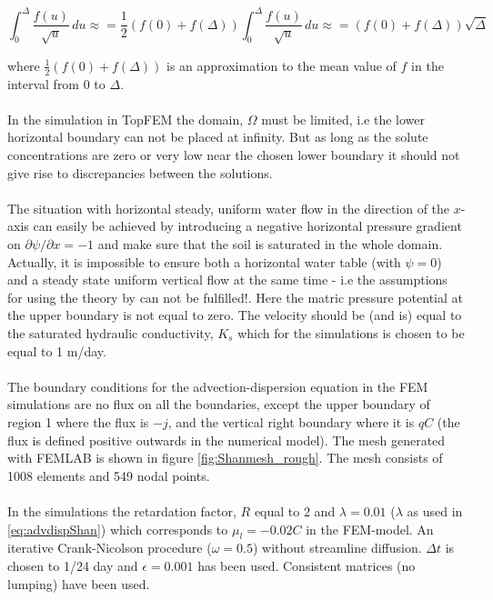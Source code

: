 \begin{equation}
\int_{0}^{\Delta}\frac{f(u)}{\sqrt{u}}\, du\approx
=\frac{1}{2}(f(0)+f(\Delta))\int_{0}^{\Delta}\frac{f(u)}{\sqrt{u}}\,
du\approx=(f(0)+f(\Delta))\sqrt{\Delta}
\end{equation}

where $\frac{1}{2}(f(0)+f(\Delta))$ is an approximation to the mean
value of $f$ in the interval from 0 to $\Delta$. \\
\\
In the simulation in TopFEM the domain, $\Omega$ must be limited, i.e
the lower horizontal boundary can not be placed at infinity. But as
long as the solute concentrations are zero or very low near the chosen
lower boundary it should not give rise to discrepancies between the
solutions.\\
\\
The situation with horizontal steady, uniform water flow in the
direction of the $x$-axis can easily be achieved by introducing a
negative horizontal pressure gradient on $\partial \psi/\partial x=-1$
and make sure that the soil is saturated in the whole domain. Actually,
it is impossible to ensure both a horizontal water table (with
$\psi=0$) and a steady state uniform vertical flow at the same
time - i.e the assumptions for using the theory by \cite{Shan} can not
be fulfilled!. Here the matric pressure potential at the upper
boundary is not equal to zero. The velocity should be (and is) equal to the
saturated hydraulic conductivity, $K_s$ which for the simulations is
chosen to be equal to 1 m/day.  \\
\\
The boundary conditions for the advection-dispersion equation in the
FEM simulations are no flux on all the boundaries, except the upper
boundary of region 1 where the flux is $-j$, and the vertical right
boundary where it is $qC$ (the flux is defined positive outwards in
the numerical model). The mesh generated with FEMLAB is shown in
figure \ref{fig:Shanmesh_rough}. The mesh consists of 1008 elements
and 549 nodal points. \\
\\
In the simulations the retardation factor, $R$  equal to 2 and
$\lambda=0.01$ ($\lambda$ as used in \ref{eq:advdispShan}) which
corresponds to $\mu_l=-0.02C$ in the FEM-model. An iterative
Crank-Nicolson procedure ($\omega=0.5$) without streamline
diffusion. $\Delta t$ is chosen to 1/24 day and $\epsilon=0.001$ has
been used. Consistent matrices (no lumping) have been used.


